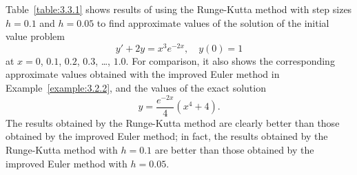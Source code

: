 \setcounter{example}{1}
\begin{example}
  \label{example:3.3.2} \rm Table~\ref{table:3.3.1} shows results of using the Runge-Kutta method
  with step sizes $h=0.1$ and $h=0.05$ to find approximate values of the solution of the initial
  value problem
  \[
    y'+2y=x^{3}e^{-2x},\quad y(0)=1
  \]
  at $x=0$, $0.1$, $0.2$, $0.3$, \dots, $1.0$. For comparison, it also shows the corresponding
  approximate values obtained with the improved Euler method in Example~\ref{example:3.2.2}, and the
  values of the exact solution
  \[
    y=\frac{e^{-2x}}{4}(x^{4}+4).
  \]
  The results obtained by the Runge-Kutta method are clearly better than those obtained by the
  improved Euler method; in fact, the results obtained by the Runge-Kutta method with $h=0.1$ are
  better than those obtained by the improved Euler method with $h=0.05$.
\end{example}
\setcounter{table}{0}
